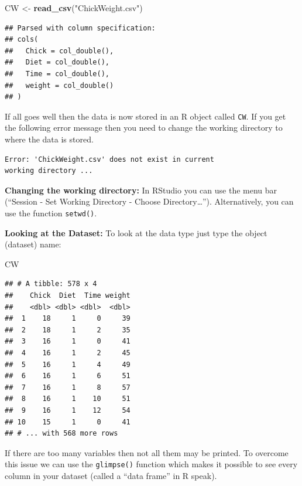 \documentclass[]{book}
\newenvironment{Shaded}{\begin{snugshade}}{\end{snugshade}}
\newcommand{\KeywordTok}[1]{\textcolor[rgb]{0.13,0.29,0.53}{\textbf{#1}}}
\newcommand{\NormalTok}[1]{#1}
\newcommand{\StringTok}[1]{\textcolor[rgb]{0.31,0.60,0.02}{#1}}
\theoremstyle{definition}
\theoremstyle{definition}
\theoremstyle{definition}
\theoremstyle{remark}
\begin{document}
\begin{Shaded}
\begin{Highlighting}[]
\NormalTok{CW <-}\StringTok{ }\KeywordTok{read_csv}\NormalTok{(}\StringTok{"ChickWeight.csv"}\NormalTok{)}
\end{Highlighting}
\end{Shaded}

\begin{verbatim}
## Parsed with column specification:
## cols(
##   Chick = col_double(),
##   Diet = col_double(),
##   Time = col_double(),
##   weight = col_double()
## )
\end{verbatim}

If all goes well then the data is now stored in an R object called \texttt{CW}. If you get the
following error message then you need to change the working directory to where the data is
stored.

\begin{verbatim}
Error: 'ChickWeight.csv' does not exist in current
working directory ...
\end{verbatim}

\textbf{Changing the working directory:}
In RStudio you can use the menu bar (``Session - Set Working Directory - Choose Directory\ldots{}''). Alternatively, you can use the function \texttt{setwd()}.

\textbf{Looking at the Dataset:}
To look at the data type just type the object (dataset) name:

\begin{Shaded}
\begin{Highlighting}[]
\NormalTok{CW}
\end{Highlighting}
\end{Shaded}

\begin{verbatim}
## # A tibble: 578 x 4
##    Chick  Diet  Time weight
##    <dbl> <dbl> <dbl>  <dbl>
##  1    18     1     0     39
##  2    18     1     2     35
##  3    16     1     0     41
##  4    16     1     2     45
##  5    16     1     4     49
##  6    16     1     6     51
##  7    16     1     8     57
##  8    16     1    10     51
##  9    16     1    12     54
## 10    15     1     0     41
## # ... with 568 more rows
\end{verbatim}

If there are too many variables then not all them may be printed. To overcome this issue
we can use the \texttt{glimpse()} function which makes it possible to see every column in your
dataset (called a ``data frame'' in R speak).
\end{document}
